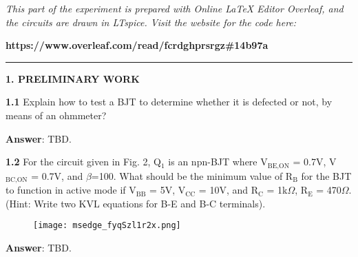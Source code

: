 \documentclass{article}
\begin{document}
\large

{\textit{This part of the experiment is prepared with Online LaTeX Editor Overleaf, and the circuits are drawn in LTspice. Visit the website for the code here:}}

{\textbf{https://www.overleaf.com/read/fcrdghprsrgz\#14b97a}}
\vspace{4mm}
\hrule
\vspace{4mm}
{\Large \textbf{1. PRELIMINARY WORK}}

\vspace{4mm}

{\textbf{1.1} Explain how to test a BJT to determine whether it is defected or not, by means of an 
ohmmeter?}

\vspace{4mm}

{\textbf{Answer}: TBD.}

\vspace{8mm}

{\textbf{1.2} For the circuit given in Fig. 2, Q$_1$ is an npn-BJT where V$_{\text{BE,ON}}$ = 0.7V, V$_{\text{BC,ON}}$ = 0.7V, and $\beta$=100. What should be the minimum value of R$_{\text{B}}$ for the BJT to function in active mode if V$_{\text{BB}}$ = 5V, V$_{\text{CC}}$ = 10V, and R$_{\text{C}}$ = 1k$\Omega$, R$_{\text{E}}$ = 470$\Omega$. (Hint: Write two KVL equations for B-E and B-C terminals).}

\begin{figure}[H]
    \centering
    \texttt{[image: msedge\_fyqSzl1r2x.png]}
\end{figure}

{\textbf{Answer}: TBD.}


\end{document}
